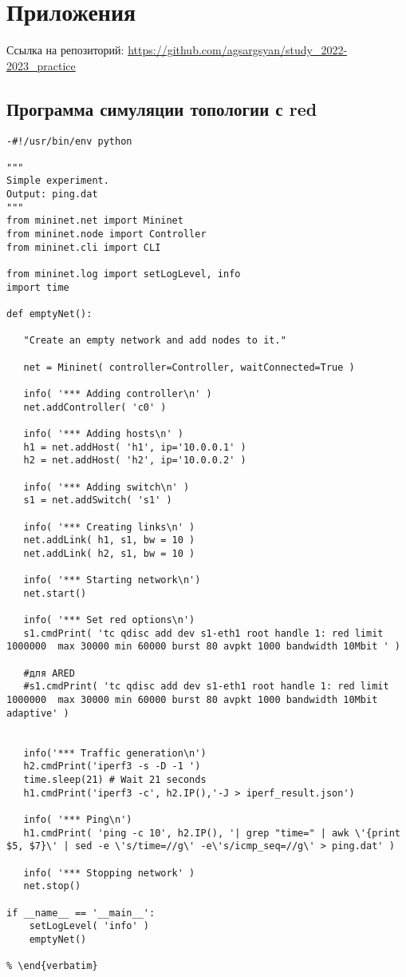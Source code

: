 \chapter*{Приложения}

Ссылка на репозиторий: 
\url{https://github.com/agsargsyan/study_2022-2023_practice}

\section*{Программа симуляции топологии с red}

\begin{verbatim}
-#!/usr/bin/env python

"""
Simple experiment.
Output: ping.dat
"""
from mininet.net import Mininet
from mininet.node import Controller
from mininet.cli import CLI

from mininet.log import setLogLevel, info
import time

def emptyNet():

   "Create an empty network and add nodes to it."

   net = Mininet( controller=Controller, waitConnected=True )

   info( '*** Adding controller\n' )
   net.addController( 'c0' )

   info( '*** Adding hosts\n' )
   h1 = net.addHost( 'h1', ip='10.0.0.1' )
   h2 = net.addHost( 'h2', ip='10.0.0.2' )

   info( '*** Adding switch\n' )
   s1 = net.addSwitch( 's1' )

   info( '*** Creating links\n' )
   net.addLink( h1, s1, bw = 10 )
   net.addLink( h2, s1, bw = 10 )

   info( '*** Starting network\n')
   net.start()

   info( '*** Set red options\n')
   s1.cmdPrint( 'tc qdisc add dev s1-eth1 root handle 1: red limit 1000000  max 30000 min 60000 burst 80 avpkt 1000 bandwidth 10Mbit ' )
   
   #для ARED
   #s1.cmdPrint( 'tc qdisc add dev s1-eth1 root handle 1: red limit 1000000  max 30000 min 60000 burst 80 avpkt 1000 bandwidth 10Mbit adaptive' )	


   info('*** Traffic generation\n')
   h2.cmdPrint('iperf3 -s -D -1 ')
   time.sleep(21) # Wait 21 seconds
   h1.cmdPrint('iperf3 -c', h2.IP(),'-J > iperf_result.json')

   info( '*** Ping\n')
   h1.cmdPrint( 'ping -c 10', h2.IP(), '| grep "time=" | awk \'{print $5, $7}\' | sed -e \'s/time=//g\' -e\'s/icmp_seq=//g\' > ping.dat' )

   info( '*** Stopping network' )
   net.stop()

if __name__ == '__main__':
    setLogLevel( 'info' )
    emptyNet()
    
% \end{verbatim}
\end{verbatim}


